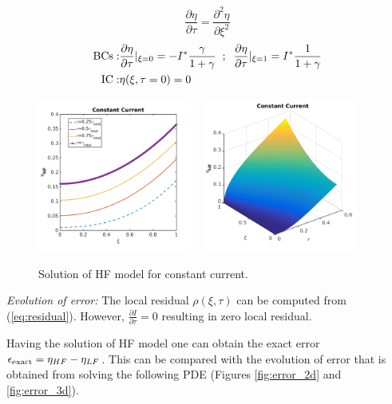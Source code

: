 \documentclass[]{article}
\begin{document}
\begin{equation*}
\frac{\partial\eta}{\partial\tau} = \frac{\partial^2\eta}{\partial\xi^2}
\end{equation*}
%
\begin{eqnarray}
{\rm BCs:} & \frac{\partial\eta}{\partial\tau}|_{\xi=0} = -I^* \frac{\gamma}{1+\gamma} \;\; ; \;\;
\frac{\partial\eta}{\partial\tau}|_{\xi=1} = I^* \frac{1}{1+\gamma}\\
{\rm IC:} & \eta(\xi,\tau=0)=0
\end{eqnarray}
%
\begin{figure}[h]
    \centering
    \includegraphics[trim = 0in 0in 0in 0in, clip, width=0.45\textwidth]{figures/etaHF2d.png}
    ~
    \includegraphics[trim = 0in 0in 0in 0in, clip, width=0.45\textwidth]{figures/etaHF3d.png}      
    \caption{Solution of HF model for constant current.}
    \label{fig:etaHF}
\end{figure}


\textit{Evolution of error:}
The local residual $\rho(\xi,\tau)$ can be computed from (\ref{eq:residual}). However, $\frac{\partial I}{\partial \tau} = 0 $ 
resulting in zero local residual.


Having the solution of HF model one can obtain the exact error $\epsilon_{\rm exact} = \eta_{HF} - \eta_{LF}$. This can be compared with
the evolution of error that is obtained from solving the following PDE (Figures \ref{fig:error_2d} and \ref{fig:error_3d}).
\end{document}
